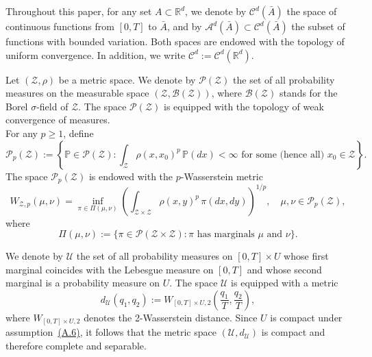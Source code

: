 \documentclass[11pt,amsfonts]{article}
\theoremstyle{plain}
\theoremstyle{assumpstyle}
\numberwithin{equation}{section}
\numberwithin{theorem}{section}
\numberwithin{proposition}{section}
\numberwithin{definition}{section}
\numberwithin{remark}{section}
\numberwithin{corollary}{section}
\numberwithin{lemma}{section}
\begin{document}
Throughout this paper, for any set $A \subset \mathbb{R}^d$, we denote by $\mathcal{C}^d(\bar{A})$ the space of continuous functions from $[0,T]$ to $\bar{A}$, and by $\mathcal{A}^d(\bar{A}) \subset \mathcal{C}^d(\bar{A})$ the subset of functions with bounded variation. Both spaces are endowed with the topology of uniform convergence. In addition, we write $\mathcal{C}^d := \mathcal{C}^d(\mathbb{R}^d)$. 

Let $(\mathcal{Z}, \rho)$ be a metric space. We denote by $\mathcal{P}(\mathcal{Z})$ the set of all probability measures on the measurable space $(\mathcal{Z}, \mathcal{B}(\mathcal{Z}))$, where $\mathcal{B}(\mathcal{Z})$ stands for the Borel $\sigma$-field of $\mathcal{Z}$. The space $\mathcal{P}(\mathcal{Z})$ is equipped with the topology of weak convergence of measures.  \\
For any $p \ge 1$, define
\begin{equation*}
\mathcal{P}_p(\mathcal{Z}) := \left\{ \mathbb{P} \in \mathcal{P}(\mathcal{Z}) : \int_{\mathcal{Z}} \rho(x, x_0)^p \, \mathbb{P}(dx) < \infty \text{ for some (hence all) } x_0 \in \mathcal{Z} \right\}.
\end{equation*}
The space $\mathcal{P}_p(\mathcal{Z})$ is endowed with the $p$-Wasserstein metric
\begin{equation*}
W_{\mathcal{Z}, p}(\mu, \nu)
= \inf_{\pi \in \Pi(\mu, \nu)}
\left( \int_{\mathcal{Z} \times \mathcal{Z}} \rho(x, y)^p \, \pi(dx, dy) \right)^{1/p},
\quad \mu, \nu \in \mathcal{P}_p(\mathcal{Z}),
\end{equation*}
where
\begin{equation*}
\Pi(\mu, \nu) := \{ \pi \in \mathcal{P}(\mathcal{Z} \times \mathcal{Z}) : \pi \text{ has marginals } \mu \text{ and } \nu \}.
\end{equation*}

We denote by $\mathcal{U}$ the set of all probability measures on $[0,T] \times U$ whose first marginal coincides with the Lebesgue measure on $[0,T]$ and whose second marginal is a probability measure on $U$. The space $\mathcal{U}$ is equipped with a metric
\begin{equation*}
d_{\mathcal{U}}(q_1, q_2)
:= W_{[0,T] \times U, 2}\left(\frac{q_1}{T}, \frac{q_2}{T}\right),
\end{equation*}
where $W_{[0,T] \times U, 2}$ denotes the 2-Wasserstein distance.  
Since $U$ is compact under assumption~\hyperlink{A.6}{(A.6)}, it follows that the metric space $(\mathcal{U}, d_{\mathcal{U}})$ is compact and therefore complete and separable.
\end{document}
